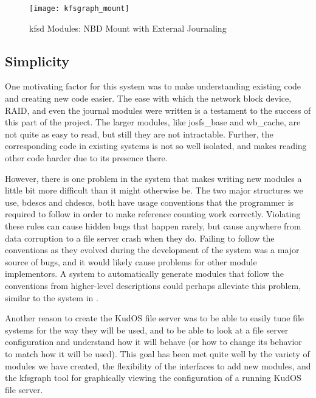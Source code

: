 \begin{figure}[htb]
\begin{center}
  \texttt{[image: kfsgraph\_mount]}
  \caption{kfsd Modules: NBD Mount with External Journaling}
  \label{fig:kfsgraph-mount}
\end{center}
\end{figure}

\subsection{Simplicity}
\label{sec:eval:simplicity}

One motivating factor for this system was to make understanding existing code
and creating new code easier. The ease with which the network block device,
RAID, and even the journal modules were written is a testament to the success of
this part of the project. The larger modules, like josfs\_base and wb\_cache,
are not quite as easy to read, but still they are not intractable. Further, the
corresponding code in existing systems is not so well isolated, and makes
reading other code harder due to its presence there.

However, there is one problem in the system that makes writing new modules a
little bit more difficult than it might otherwise be. The two major structures
we use, bdescs and chdescs, both have usage conventions that the programmer is
required to follow in order to make reference counting work correctly. Violating
these rules can cause hidden bugs that happen rarely, but cause anywhere from
data corruption to a file server crash when they do. Failing to follow the
conventions as they evolved during the development of the system was a major
source of bugs, and it would likely cause problems for other module
implementors. A system to automatically generate modules that follow the
conventions from higher-level descriptions could perhaps alleviate this problem,
similar to the system in \cite{zadok00fist}.

Another reason to create the KudOS file server was to be able to easily tune
file systems for the way they will be used, and to be able to look at a file
server configuration and understand how it will behave (or how to change its
behavior to match how it will be used). This goal has been met quite well by the
variety of modules we have created, the flexibility of the interfaces to add new
modules, and the kfsgraph tool for graphically viewing the configuration of a
running KudOS file server.

